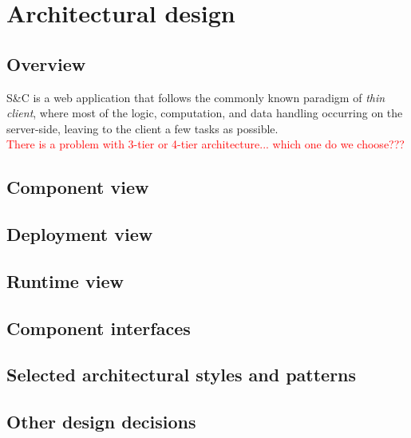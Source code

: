 \documentclass[11pt,twoside]{article}
\begin{document}
\newpage

\section{Architectural design}
	\subsection{Overview}
S\&C is a web application that follows the commonly known paradigm of \textit{thin client}, where most of the logic, computation, and data handling occurring on the server-side, leaving to the client a few tasks as possible.\\
\textcolor{red}{There is a problem with 3-tier or 4-tier architecture... which one do we choose???}
	
	\subsection{Component view}
	\subsection{Deployment view}
	\subsection{Runtime view}
	\subsection{Component interfaces}
	\subsection{Selected architectural styles and patterns}
	\subsection{Other design decisions}

\newpage
\end{document}
